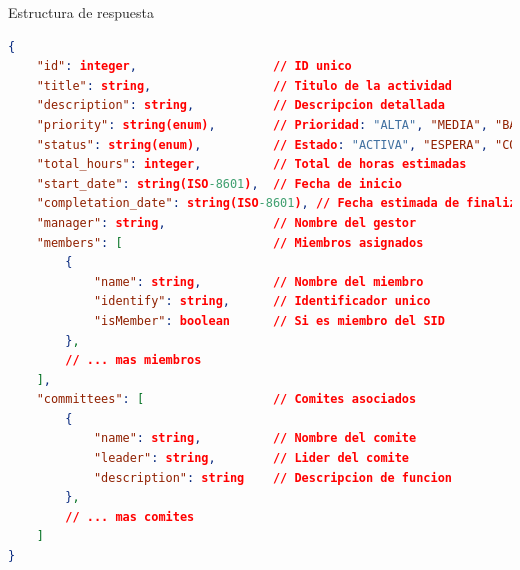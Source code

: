 \documentclass[11pt,a4paper]{article}
\begin{document}
\begin{center}
	\begin{minipage}{\textwidth}
		\begin{codebox}{Estructura de respuesta}
			\begin{lstlisting}[language=json]
{
    "id": integer,                   // ID unico
    "title": string,                 // Titulo de la actividad
    "description": string,           // Descripcion detallada
    "priority": string(enum),        // Prioridad: "ALTA", "MEDIA", "BAJA"
    "status": string(enum),          // Estado: "ACTIVA", "ESPERA", "COMPLETADA", "CANCELADA"
    "total_hours": integer,          // Total de horas estimadas
    "start_date": string(ISO-8601),  // Fecha de inicio
    "completation_date": string(ISO-8601), // Fecha estimada de finalizacion
    "manager": string,               // Nombre del gestor
    "members": [                     // Miembros asignados
        {
            "name": string,          // Nombre del miembro
            "identify": string,      // Identificador unico
            "isMember": boolean      // Si es miembro del SID
        },
        // ... mas miembros
    ],
    "committees": [                  // Comites asociados
        {
            "name": string,          // Nombre del comite
            "leader": string,        // Lider del comite
            "description": string    // Descripcion de funcion
        },
        // ... mas comites
    ]
}
\end{lstlisting}
		\end{codebox}
	\end{minipage}
\end{center}
\end{document}
